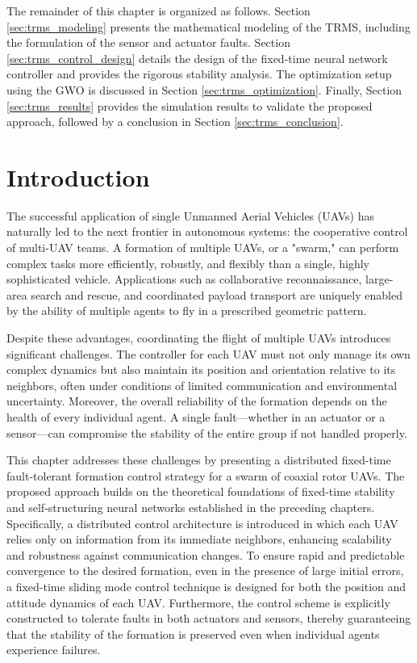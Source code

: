 The remainder of this chapter is organized as follows. Section \ref{sec:trms_modeling} presents the mathematical modeling of the TRMS, including the formulation of the sensor and actuator faults. Section \ref{sec:trms_control_design} details the design of the fixed-time neural network controller and provides the rigorous stability analysis. The optimization setup using the GWO is discussed in Section \ref{sec:trms_optimization}. Finally, Section \ref{sec:trms_results} provides the simulation results to validate the proposed approach, followed by a conclusion in Section \ref{sec:trms_conclusion}.
\section{Introduction}
\label{sec:formation_intro}

The successful application of single Unmanned Aerial Vehicles (UAVs) has naturally led to the next frontier in autonomous systems: the cooperative control of multi-UAV teams. A formation of multiple UAVs, or a "swarm," can perform complex tasks more efficiently, robustly, and flexibly than a single, highly sophisticated vehicle. Applications such as collaborative reconnaissance, large-area search and rescue, and coordinated payload transport are uniquely enabled by the ability of multiple agents to fly in a prescribed geometric pattern.

Despite these advantages, coordinating the flight of multiple UAVs introduces significant challenges. The controller for each UAV must not only manage its own complex dynamics but also maintain its position and orientation relative to its neighbors, often under conditions of limited communication and environmental uncertainty. Moreover, the overall reliability of the formation depends on the health of every individual agent. A single fault—whether in an actuator or a sensor—can compromise the stability of the entire group if not handled properly.

This chapter addresses these challenges by presenting a distributed fixed-time fault-tolerant formation control strategy for a swarm of coaxial rotor UAVs. The proposed approach builds on the theoretical foundations of fixed-time stability and self-structuring neural networks established in the preceding chapters. Specifically, a distributed control architecture is introduced in which each UAV relies only on information from its immediate neighbors, enhancing scalability and robustness against communication changes. To ensure rapid and predictable convergence to the desired formation, even in the presence of large initial errors, a fixed-time sliding mode control technique is designed for both the position and attitude dynamics of each UAV. Furthermore, the control scheme is explicitly constructed to tolerate faults in both actuators and sensors, thereby guaranteeing that the stability of the formation is preserved even when individual agents experience failures.

